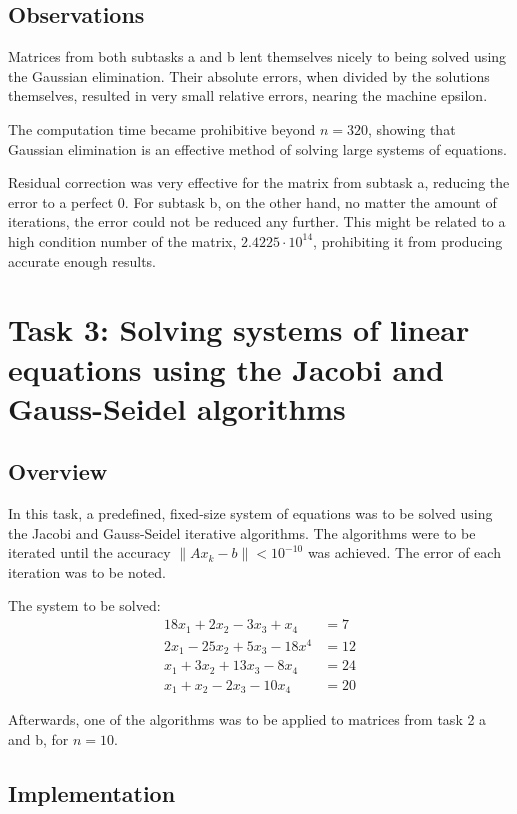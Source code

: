 \documentclass{article}
\begin{document}
	\newpage
	\subsection{Observations}
	
	Matrices from both subtasks a and b lent themselves nicely to being solved
	using the Gaussian elimination. Their absolute errors, when divided by the
	solutions themselves, resulted in very small relative errors, nearing the
	machine epsilon.
	
	The computation time became prohibitive beyond $n = 320$, showing that
	Gaussian elimination is an effective method of solving large systems
	of equations.
	
	Residual correction was very effective for the matrix from subtask a,
	reducing the error to a perfect $0$. For subtask b, on the other hand, no
	matter the amount of iterations, the error could not be reduced any further.
	This might be related to a high condition number of the matrix,
	$2.4225 \cdot 10^{14}$, prohibiting it from producing accurate enough
	results.
	
	\newpage
	\section{Task 3: Solving systems of linear equations using the Jacobi and
	Gauss-Seidel algorithms}
	
	\subsection{Overview}
	
	In this task, a predefined, fixed-size system of equations was to be solved
	using the Jacobi and Gauss-Seidel iterative algorithms. The algorithms were
	to be iterated until the accuracy $\lVert Ax_k - b \rVert < 10^{-10}$ was
	achieved. The error of each iteration was to be noted.
	
	The system to be solved:
	\begin{align*}
		18x_1 + 2x_2 - 3x_3 + x_4 & = 7\\
		2x_1 - 25x_2 + 5x_3 - 18x^4 & = 12\\
		x_1 + 3x_2 + 13x_3 - 8x_4 & = 24\\
		x_1 + x_2 - 2x_3 - 10x_4 & = 20
	\end{align*}
	
	Afterwards, one of the algorithms was to be applied to matrices from task 2
	a and b, for $n = 10$.
	
	\subsection{Implementation}
	
\end{document}
